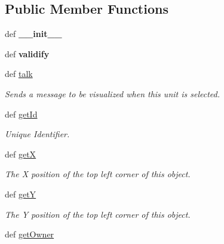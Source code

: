 \subsection*{Public Member Functions}
\begin{DoxyCompactItemize}
\item 
\hypertarget{classGameObject_1_1Wall_a216c45c047f96de9ef04caf5efe57fa1}{
def {\bfseries \_\-\_\-init\_\-\_\-}}
\label{classGameObject_1_1Wall_a216c45c047f96de9ef04caf5efe57fa1}

\item 
\hypertarget{classGameObject_1_1Wall_ad6dadcc822c606f8cd60ab8925822097}{
def {\bfseries validify}}
\label{classGameObject_1_1Wall_ad6dadcc822c606f8cd60ab8925822097}

\item 
\hypertarget{classGameObject_1_1Wall_aaff85bff56a8e19ea844573773e1936b}{
def \hyperlink{classGameObject_1_1Wall_aaff85bff56a8e19ea844573773e1936b}{talk}}
\label{classGameObject_1_1Wall_aaff85bff56a8e19ea844573773e1936b}

\begin{DoxyCompactList}\small\item\em Sends a message to be visualized when this unit is selected. \item\end{DoxyCompactList}\item 
\hypertarget{classGameObject_1_1Wall_afbaaf0e2bde922af009a6f4685ccc589}{
def \hyperlink{classGameObject_1_1Wall_afbaaf0e2bde922af009a6f4685ccc589}{getId}}
\label{classGameObject_1_1Wall_afbaaf0e2bde922af009a6f4685ccc589}

\begin{DoxyCompactList}\small\item\em Unique Identifier. \item\end{DoxyCompactList}\item 
def \hyperlink{classGameObject_1_1Wall_aa8d092fd75ef8372aacf4ece64521ea8}{getX}
\begin{DoxyCompactList}\small\item\em The X position of the top left corner of this object. \item\end{DoxyCompactList}\item 
def \hyperlink{classGameObject_1_1Wall_ac87b620714dfacc5ac12ca6078a91460}{getY}
\begin{DoxyCompactList}\small\item\em The Y position of the top left corner of this object. \item\end{DoxyCompactList}\item 
\hypertarget{classGameObject_1_1Wall_ad95dd3f80c773e982263873044771f31}{
def \hyperlink{classGameObject_1_1Wall_ad95dd3f80c773e982263873044771f31}{getOwner}}
\label{classGameObject_1_1Wall_ad95dd3f80c773e982263873044771f31}


\end{DoxyCompactItemize}
